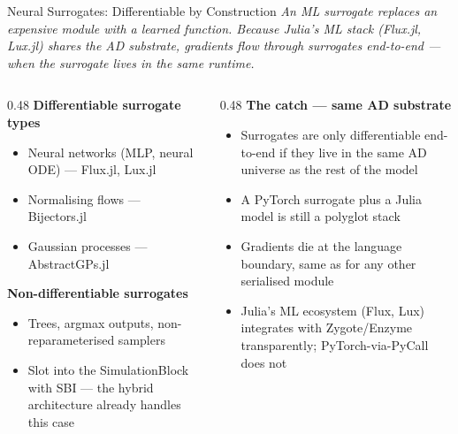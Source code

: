 \documentclass[aspectratio=169]{beamer}
\begin{document}
\begin{frame}[noframenumbering]{Neural Surrogates: Differentiable by Construction}
	\footnotesize
	\textit{An ML surrogate replaces an expensive module with a learned function. Because Julia's ML stack (Flux.jl, Lux.jl) shares the AD substrate, gradients flow through surrogates end-to-end --- when the surrogate lives in the same runtime.}

	\bigskip
	\begin{columns}[T]
		\begin{column}{0.48\textwidth}
			\textbf{Differentiable surrogate types}
			\begin{itemize}\itemsep3pt\parskip0pt
				\item Neural networks (MLP, neural ODE) --- Flux.jl, Lux.jl
				\item Normalising flows --- Bijectors.jl
				\item Gaussian processes --- AbstractGPs.jl
			\end{itemize}

			\bigskip
			\textbf{Non-differentiable surrogates}
			\begin{itemize}\itemsep3pt\parskip0pt
				\item Trees, argmax outputs, non-reparameterised samplers
				\item Slot into the SimulationBlock with SBI --- the hybrid architecture already handles this case
			\end{itemize}
		\end{column}
		\begin{column}{0.48\textwidth}
			\textbf{The catch --- same AD substrate}
			\begin{itemize}\itemsep3pt\parskip0pt
				\item Surrogates are only differentiable end-to-end if they live in the same AD universe as the rest of the model
				\item A PyTorch surrogate plus a Julia model is still a polyglot stack
				\item Gradients die at the language boundary, same as for any other serialised module
				\item Julia's ML ecosystem (Flux, Lux) integrates with Zygote/Enzyme transparently; PyTorch-via-PyCall does not
			\end{itemize}
		\end{column}
	\end{columns}
\end{frame}
\end{document}
